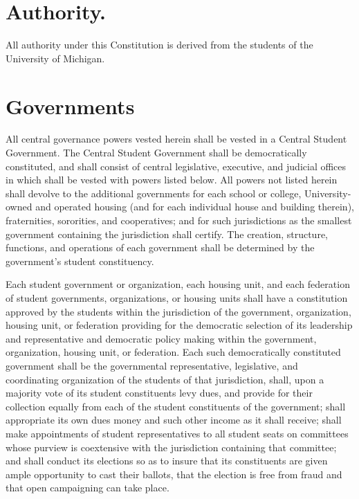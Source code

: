 \section{Authority.}
    All authority under this Constitution is derived from the students of the University of Michigan.

\section{Governments}
    All central governance powers vested herein shall be vested in a Central Student Government. The Central Student Government shall be democratically constituted, and shall consist of central legislative, executive, and judicial offices in which shall be vested with powers listed below. All powers not listed herein shall devolve to the additional governments for each school or college, University-owned and operated housing (and for each individual house and building therein), fraternities, sororities, and cooperatives; and for such jurisdictions as the smallest government containing the jurisdiction shall certify. The creation, structure, functions, and operations of each government shall be determined by the government's student constituency.

    Each student government or organization, each housing unit, and each federation of student governments, organizations, or housing units shall have a constitution approved by the students within the jurisdiction of the government, organization, housing unit, or federation providing for the democratic selection of its leadership and representative and democratic policy making within the government, organization, housing unit, or federation. Each such democratically constituted government shall be the governmental representative, legislative, and coordinating organization of the students of that jurisdiction, shall, upon a majority vote of its student constituents levy dues, and provide for their collection equally from each of the student constituents of the government; shall appropriate its own dues money and such other income as it shall receive; shall make appointments of student representatives to all student seats on committees whose purview is coextensive with the jurisdiction containing that committee; and shall conduct its elections so as to insure that its constituents are given ample opportunity to cast their ballots, that the election is free from fraud and that open campaigning can take place.
